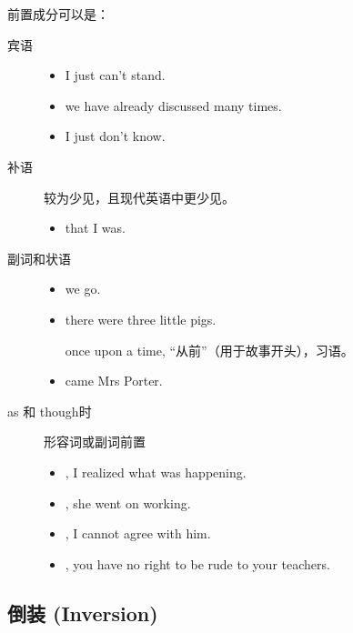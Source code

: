 前置成分可以是：
\begin{description}
\item[宾语]
  \begin{itemize}
  \item {} I just can't stand.
  \item {} we have already discussed many times.

  \item  {} I just don't know.
  \end{itemize}
\item[补语] 较为少见，且现代英语中更少见。
  \begin{itemize}
  \item {} that I was.
  \end{itemize}

\item[副词和状语]
  \begin{itemize}
  \item {} we go.

  \item {} there were three little pigs.

    once upon a time, “从前”（用于故事开头），习语。
  \item {} came Mrs Porter.

  \end{itemize}
\item[as 和 though时] 形容词或副词前置
  \begin{itemize}
  \item {}, I realized what was happening.

  \item {}, she went on working.

  \item {}, I cannot agree with him.

  \item {}, you have no right to be rude to your teachers.

  \end{itemize}
\end{description}


\subsection{倒装 (Inversion)}
\label{subsec:inversion}

